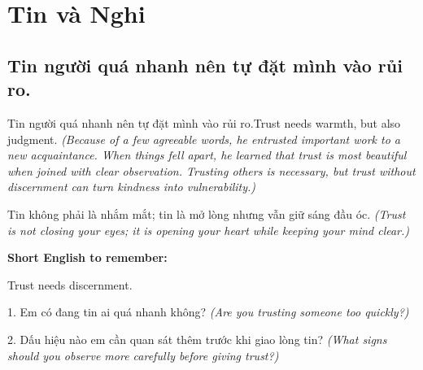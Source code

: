 \chapter{Tin và Nghi}

\section{Tin người quá nhanh nên tự đặt mình vào rủi ro.}
\begin{truyen}{Tin người quá nhanh nên tự đặt mình vào rủi ro.}{Trust needs warmth, but also judgment.}
\textit{(Because of a few agreeable words, he entrusted important work to a new acquaintance. When things fell apart, he learned that trust is most beautiful when joined with clear observation. Trusting others is necessary, but trust without discernment can turn kindness into vulnerability.)}
\end{truyen}
\begin{baihoc}
Tin không phải là nhắm mắt; tin là mở lòng nhưng vẫn giữ sáng đầu óc.
\textit{(Trust is not closing your eyes; it is opening your heart while keeping your mind clear.)}
\end{baihoc}
\begin{ghinhoanh}
\textbf{Short English to remember:}

Trust needs discernment.
\end{ghinhoanh}
\begin{tuhocnhanh}
1. Em có đang tin ai quá nhanh không? \textit{(Are you trusting someone too quickly?)}

2. Dấu hiệu nào em cần quan sát thêm trước khi giao lòng tin? \textit{(What signs should you observe more carefully before giving trust?)}
\end{tuhocnhanh}
\ngancach

